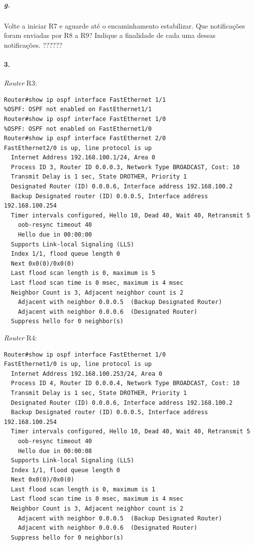 \subparagraph{g.}
Volte a iniciar R7 e aguarde até o encaminhamento estabilizar. Que notificações foram enviadas por R8 a R9? Indique a finalidade de cada uma dessas notificações.
??????

\paragraph{3.}
\emph{Router} \textsf{R3}:
\begin{verbatim}
Router#show ip ospf interface FastEthernet 1/1
%OSPF: OSPF not enabled on FastEthernet1/1
Router#show ip ospf interface FastEthernet 1/0
%OSPF: OSPF not enabled on FastEthernet1/0
Router#show ip ospf interface FastEthernet 2/0
FastEthernet2/0 is up, line protocol is up 
  Internet Address 192.168.100.1/24, Area 0 
  Process ID 3, Router ID 0.0.0.3, Network Type BROADCAST, Cost: 10
  Transmit Delay is 1 sec, State DROTHER, Priority 1 
  Designated Router (ID) 0.0.0.6, Interface address 192.168.100.2
  Backup Designated router (ID) 0.0.0.5, Interface address 192.168.100.254
  Timer intervals configured, Hello 10, Dead 40, Wait 40, Retransmit 5
    oob-resync timeout 40
    Hello due in 00:00:00
  Supports Link-local Signaling (LLS)
  Index 1/1, flood queue length 0
  Next 0x0(0)/0x0(0)
  Last flood scan length is 0, maximum is 5
  Last flood scan time is 0 msec, maximum is 4 msec
  Neighbor Count is 3, Adjacent neighbor count is 2 
    Adjacent with neighbor 0.0.0.5  (Backup Designated Router)
    Adjacent with neighbor 0.0.0.6  (Designated Router)
  Suppress hello for 0 neighbor(s)
\end{verbatim}

\emph{Router} \textsf{R4}:
\begin{verbatim}
Router#show ip ospf interface FastEthernet 1/0
FastEthernet1/0 is up, line protocol is up 
  Internet Address 192.168.100.253/24, Area 0 
  Process ID 4, Router ID 0.0.0.4, Network Type BROADCAST, Cost: 10
  Transmit Delay is 1 sec, State DROTHER, Priority 1 
  Designated Router (ID) 0.0.0.6, Interface address 192.168.100.2
  Backup Designated router (ID) 0.0.0.5, Interface address 192.168.100.254
  Timer intervals configured, Hello 10, Dead 40, Wait 40, Retransmit 5
    oob-resync timeout 40
    Hello due in 00:00:08
  Supports Link-local Signaling (LLS)
  Index 1/1, flood queue length 0
  Next 0x0(0)/0x0(0)
  Last flood scan length is 0, maximum is 1
  Last flood scan time is 0 msec, maximum is 4 msec
  Neighbor Count is 3, Adjacent neighbor count is 2 
    Adjacent with neighbor 0.0.0.5  (Backup Designated Router)
    Adjacent with neighbor 0.0.0.6  (Designated Router)
  Suppress hello for 0 neighbor(s)
\end{verbatim}

